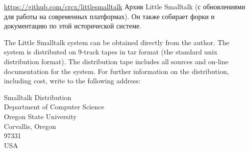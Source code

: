
\url{https://github.com/crcx/littlesmalltalk} Архив Little Smalltalk 
(с обновлениями для работы на современных платформах). 
Он также собирает форки и документацию по этой исторической системе.

\bigskip

The Little Smalltalk system can be obtained directly from the author. The
system is distributed on 9-track tapes in tar format (the standard unix
distribution format). The distribution tape includes all sources and on-line
documentation for the system. For further information on the distribution,
including cost, write to the following address:

\bigskip\noindent
Smalltalk Distribution\\
Department of Computer Science\\
Oregon State University\\
Corvallis, Oregon\\
97331\\
USA
